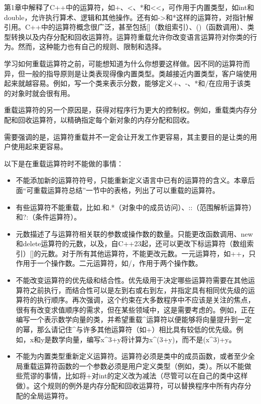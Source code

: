 
第1章中解释了C++中的运算符，如+、<、*和<{}<，可作用于内置类型，如int和double，允许执行算术、逻辑和其他操作。还有如->和*这样的运算符，对指针解引用。C++中的运算符概念很广泛，甚至包括[]（数组索引）、()（函数调用）、类型转换以及内存分配和回收运算符。运算符重载允许你改变语言运算符对你类的行为。然而，这种能力也有自己的规则、限制和选择。


学习如何重载运算符之前，可能想知道为什么你想要这样做。因不同的运算符而异，但一般的指导原则是让类表现得像内置类型。类越接近内置类型，客户端使用起来就越容易。例如，写一个类来表示分数，能够定义+、-、*和/在应用于该类的对象时就会很有用。

重载运算符的另一个原因是，获得对程序行为更大的控制权。例如，重载类内存分配和回收运算符，以精确指定每个新对象的内存分配和回收。

需要强调的是，运算符重载并不一定会让开发工作更容易，其主要目的是让类的用户使用起来更容易。


以下是在重载运算符时不能做的事情：

\begin{itemize}
\item
不能添加新的运算符符号，只能重新定义语言中已有的运算符的含义。本章后面“可重载运算符总结”一节中的表格，列出了可以重载的运算符。

\item
有些运算符不能重载，比如.和.*（对象中的成员访问）、::（范围解析运算符）和?:（条件运算符）。

\item
元数描述了与运算符相关联的参数或操作数的数量。只能更改函数调用、new和delete运算符的元数，以及，自C++23起，还可以更改下标运算符（数组索引）[]的元数。对于所有其他运算符，不能更改元数。一元运算符，如++，只作用于一个操作数。二元运算符，如/，作用于两个操作数。

\item
不能改变运算符的优先级和结合性。优先级用于决定哪些运算符需要在其他运算符之前执行，而结合性可以是左到右或右到左，并指定具有相同优先级的运算符的执行顺序。再次强调，这个约束在大多数程序中不应该是关注的焦点，很有有改变求值顺序的需求，但在某些领域中，这是需要考虑的。例如，正在编写一个表示数学向量的类，并希望重载\^{}运算符以便能够将向量提升到一定的幂，那么请记住\^{}与许多其他运算符（如+）相比具有较低的优先级。例如，x和y是数学向量，编写x\^{}3+y将计算为x\^{}(3+y)，而不是(x\^{}3)+y。

\item
不能为内置类型重新定义运算符。运算符必须是类中的成员函数，或者至少全局重载运算符函数的一个参数必须是用户定义类型（例如，类）。所以不能做些荒谬的事情，比如将+对int的定义改为减法（尽管可以在自己的类中这样做）。这个规则的例外是内存分配和回收运算符，可以替换程序中所有内存分配的全局运算符。
\end{itemize}

